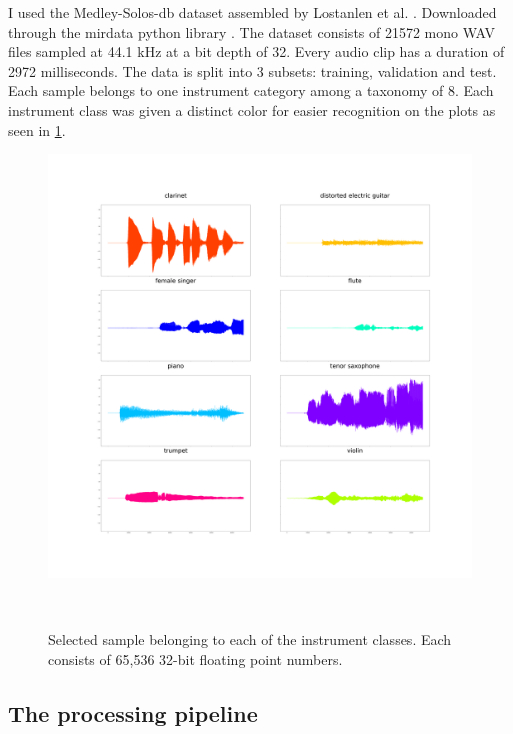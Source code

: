 \documentclass[11pt]{article}
\begin{document}
I used the Medley-Solos-db dataset assembled by Lostanlen et al. \cite{medley}. Downloaded through the mirdata python library \cite{bittner_fuentes_2019}. The dataset consists of 21572 mono WAV files sampled at 44.1 kHz at a bit depth of 32. Every audio clip has a duration of 2972 milliseconds. The data is split into 3 subsets: training, validation and test. Each sample belongs to one instrument category among a taxonomy of 8. Each instrument class was given a distinct color for easier recognition on the plots as seen in \ref{fig:8-plots}.
\begin{figure}[h]
\centering
\includegraphics[width=.9\linewidth]{./Figures/8_samples.png}
\caption{\label{fig:8-plots}Selected sample belonging to each of the instrument classes. Each consists of 65,536 32-bit floating point numbers.}
\
\end{figure}

\subsection{The processing pipeline}
\label{sec:org82c3cb3}
\end{document}
